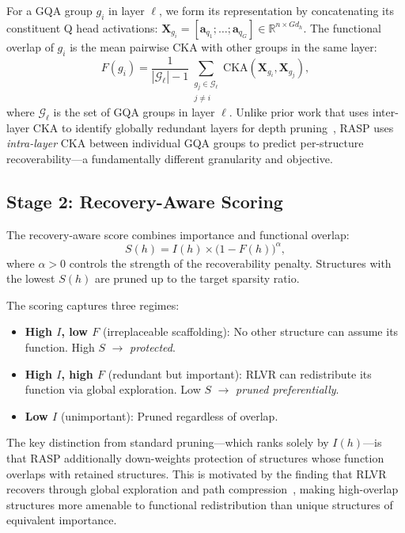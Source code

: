 For a GQA group $g_i$ in layer $\ell$, we form its representation by concatenating its constituent Q head activations: $\mathbf{X}_{g_i} = [\mathbf{a}_{q_1}; \ldots; \mathbf{a}_{q_G}] \in \mathbb{R}^{n \times Gd_h}$.
The functional overlap of $g_i$ is the mean pairwise CKA with other groups in the same layer:
\begin{equation}
    F(g_i) = \frac{1}{|\mathcal{G}_\ell| - 1} \sum_{\substack{g_j \in \mathcal{G}_\ell \\ j \neq i}} \text{CKA}(\mathbf{X}_{g_i}, \mathbf{X}_{g_j}),
    \label{eq:overlap}
\end{equation}
where $\mathcal{G}_\ell$ is the set of GQA groups in layer $\ell$.
Unlike prior work that uses inter-layer CKA to identify globally redundant layers for depth pruning~\citep{mpruner2024,lachance2024cka}, RASP uses \emph{intra-layer} CKA between individual GQA groups to predict per-structure recoverability---a fundamentally different granularity and objective.

\subsection{Stage 2: Recovery-Aware Scoring}
\label{sec:stage2}

The recovery-aware score combines importance and functional overlap:
\begin{equation}
    S(h) = I(h) \times \big(1 - F(h)\big)^\alpha,
    \label{eq:score}
\end{equation}
where $\alpha > 0$ controls the strength of the recoverability penalty.
Structures with the lowest $S(h)$ are pruned up to the target sparsity ratio.

The scoring captures three regimes:
\begin{itemize}[nosep,leftmargin=*]
    \item \textbf{High $I$, low $F$} (irreplaceable scaffolding): No other structure can assume its function. High $S$ $\rightarrow$ \emph{protected}.
    \item \textbf{High $I$, high $F$} (redundant but important): RLVR can redistribute its function via global exploration. Low $S$ $\rightarrow$ \emph{pruned preferentially}.
    \item \textbf{Low $I$} (unimportant): Pruned regardless of overlap.
\end{itemize}

The key distinction from standard pruning---which ranks solely by $I(h)$---is that RASP additionally down-weights protection of structures whose function overlaps with retained structures.
This is motivated by the finding that RLVR recovers through global exploration and path compression~\citep{rlsqueezes2026}, making high-overlap structures more amenable to functional redistribution than unique structures of equivalent importance.

